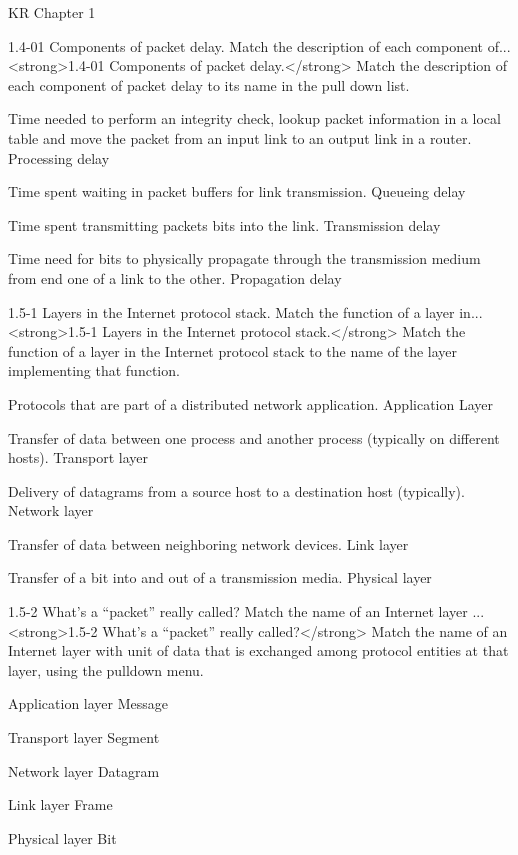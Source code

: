 \documentclass[a4paper]{article}
\begin{document}
\begin{quiz}{KR Chapter 1}
\begin{matching}[
	points=1,
	penalty=0.33333,
]{1.4-01 Components of packet delay. Match the description of each component of...}
<strong>1.4-01 Components of packet delay.</strong> Match the description of each component of packet delay to its name in the pull down list.
\item Time needed to perform an integrity check, lookup packet information in a local table and move the packet from an input link to an output link in a router. \answer Processing delay
\item Time spent waiting in packet buffers for link transmission. \answer Queueing delay
\item Time spent transmitting packets bits into the link. \answer Transmission delay
\item Time need for bits to physically propagate through the transmission medium from end one of a link to the other. \answer Propagation delay
\end{matching}

\begin{matching}[
	points=1,
	penalty=0.33333,
]{1.5-1 Layers in the Internet protocol stack. Match the function of a layer in...}
<strong>1.5-1 Layers in the Internet protocol stack.</strong> Match the function of a layer in the Internet protocol stack to the name of the layer implementing that function.
\item Protocols that are part of a distributed network application. \answer Application Layer
\item Transfer of data between one process and another process (typically on different hosts). \answer Transport layer
\item Delivery of datagrams from a source host to a destination host (typically). \answer Network layer
\item Transfer of data between neighboring network devices. \answer Link layer
\item Transfer of a bit into and out of a transmission media. \answer Physical layer
\end{matching}

\begin{matching}[
	points=1,
	penalty=0.33333,
]{1.5-2 What’s a “packet” really called? Match the name of an Internet layer ...}
<strong>1.5-2 What’s a “packet” really called?</strong> Match the name of an Internet layer with unit of data that is exchanged among protocol entities at that layer, using the pulldown menu.
\item Application layer \answer Message
\item Transport layer \answer Segment
\item Network layer \answer Datagram
\item Link layer \answer Frame
\item Physical layer \answer Bit
\end{matching}


\end{quiz}
\end{document}

